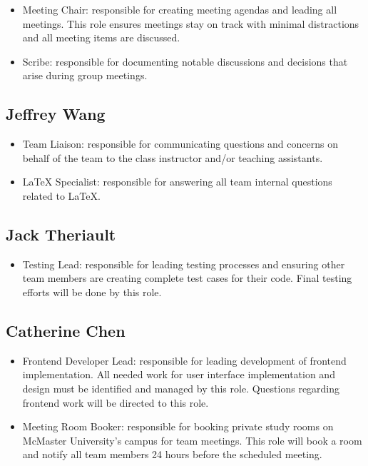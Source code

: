 \documentclass{article}
\begin{document}
\begin{itemize}
	\item Meeting Chair: responsible for creating meeting agendas and leading all meetings. This role ensures meetings stay on track with minimal distractions and all meeting items are discussed. 
	\item Scribe: responsible for documenting notable discussions and decisions that arise during group meetings.
\end{itemize}

\subsection{Jeffrey Wang}

\begin{itemize}
	\item Team Liaison: responsible for communicating questions and concerns on behalf of the team to the class instructor and/or teaching assistants. 
	\item LaTeX Specialist: responsible for answering all team internal questions related to LaTeX. 
\end{itemize}

\subsection{Jack Theriault}

\begin{itemize}
	\item Testing Lead: responsible for leading testing processes and ensuring other team members are creating complete test cases for their code. Final testing efforts will be done by this role.
\end{itemize}

\subsection{Catherine Chen}

\begin{itemize}
	\item Frontend Developer Lead: responsible for leading development of frontend implementation. All needed work for user interface implementation and design must be identified and managed by this role. Questions regarding frontend work will be directed to this role.
	\item Meeting Room Booker: responsible for booking private study rooms on McMaster University's campus for team meetings. This role will book a room and notify all team members 24 hours before the scheduled meeting.
\end{itemize}
\end{document}
